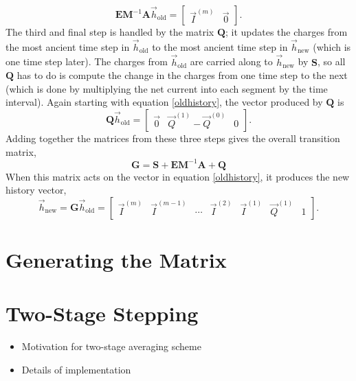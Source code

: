 \documentclass{article}
\newcommand{\mat}{\mathbf}
\begin{document}
\begin{equation}
\mat{E}\mat{M}^{-1}\mat{A}\vec{h}_\text{old} = 
\begin{bmatrix}
\vec{I}^{(m)} & \vec{0}
\end{bmatrix}.
\end{equation}
The third and final step is handled by the matrix $\mat{Q}$; it updates the charges from the most ancient time step in $\vec{h}_\text{old}$ to the most ancient time step in $\vec{h}_\text{new}$ (which is one time step later). The charges from $\vec{h}_\text{old}$ are carried along to $\vec{h}_\text{new}$ by $\mat{S}$, so all $\mat{Q}$ has to do is compute the change in the charges from one time step to the next (which is done by multiplying the net current into each segment by the time interval). Again starting with equation \ref{oldhistory}, the vector produced by $\mat{Q}$ is
\begin{equation}
\mat{Q}\vec{h}_\text{old} = 
\begin{bmatrix}
\vec{0} & \vec{Q}^{(1)} - \vec{Q}^{(0)} & 0
\end{bmatrix}.
\end{equation}
Adding together the matrices from these three steps gives the overall transition matrix,
\begin{equation}
\mat{G} = \mat{S} + \mat{E}\mat{M}^{-1}\mat{A} + \mat{Q}
\end{equation}
When this matrix acts on the vector in equation \ref{oldhistory}, it produces the new history vector,
\begin{equation}
\vec{h}_\text{new} = \mat{G}\vec{h}_\text{old} = 
\begin{bmatrix}
\vec{I}^{(m)} & \vec{I}^{(m-1)} & \cdots & \vec{I}^{(2)} & \vec{I}^{(1)} & \vec{Q}^{(1)} & 1
\end{bmatrix}.
\end{equation}

\section{Generating the Matrix}

\section{Two-Stage Stepping}
\begin{itemize}
\item Motivation for two-stage averaging scheme
\item Details of implementation
\end{itemize}
\end{document}
